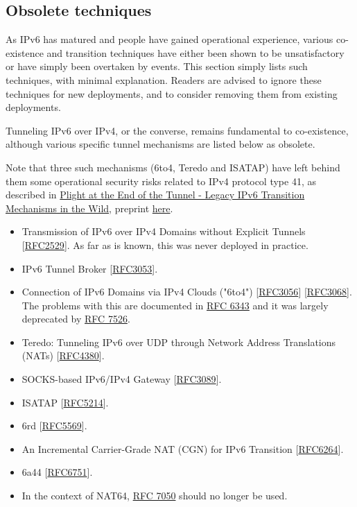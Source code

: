 \documentclass[
]{article}
\begin{document}
\pagebreak

\subsection{Obsolete techniques}\label{obsolete-techniques}

As IPv6 has matured and people have gained operational experience,
various co-existence and transition techniques have either been shown to
be unsatisfactory or have simply been overtaken by events. This section
simply lists such techniques, with minimal explanation. Readers are
advised to ignore these techniques for new deployments, and to consider
removing them from existing deployments.

Tunneling IPv6 over IPv4, or the converse, remains fundamental to
co-existence, although various specific tunnel mechanisms are listed
below as obsolete.

Note that three such mechanisms (6to4, Teredo and ISATAP) have left
behind them some operational security risks related to IPv4 protocol
type 41, as described in
\href{https://doi.org/10.1007/978-3-030-72582-2_23}{Plight at the End of
the Tunnel - Legacy IPv6 Transition Mechanisms in the Wild}, preprint
\href{https://dataplane.org/jtk/publications/kgkp-pam-21.pdf}{here}.

\begin{itemize}
\item
  Transmission of IPv6 over IPv4 Domains without Explicit Tunnels
  {[}\href{https://www.rfc-editor.org/info/rfc2529}{RFC2529}{]}. As far
  as is known, this was never deployed in practice.
\item
  IPv6 Tunnel Broker
  {[}\href{https://www.rfc-editor.org/info/rfc3053}{RFC3053}{]}.
\item
  Connection of IPv6 Domains via IPv4 Clouds ("6to4")
  {[}\href{https://www.rfc-editor.org/info/rfc3056}{RFC3056}{]}
  {[}\href{https://www.rfc-editor.org/info/rfc3068}{RFC3068}{]}. The
  problems with this are documented in
  \href{https://www.rfc-editor.org/info/rfc6343}{RFC 6343} and it was
  largely deprecated by
  \href{https://www.rfc-editor.org/info/rfc7526}{RFC 7526}.
\item
  Teredo: Tunneling IPv6 over UDP through Network Address Translations
  (NATs) {[}\href{https://www.rfc-editor.org/info/rfc4380}{RFC4380}{]}.
\item
  SOCKS-based IPv6/IPv4 Gateway
  {[}\href{https://www.rfc-editor.org/info/rfc3089}{RFC3089}{]}.
\item
  ISATAP {[}\href{https://www.rfc-editor.org/info/rfc5214}{RFC5214}{]}.
\item
  6rd {[}\href{https://www.rfc-editor.org/info/rfc5569}{RFC5569}{]}.
\item
  An Incremental Carrier-Grade NAT (CGN) for IPv6 Transition
  {[}\href{https://www.rfc-editor.org/info/rfc6264}{RFC6264}{]}.
\item
  6a44 {[}\href{https://www.rfc-editor.org/info/rfc6751}{RFC6751}{]}.
\item
  In the context of NAT64,
  \href{https://www.rfc-editor.org/info/rfc7050}{RFC 7050} should no
  longer be used.
\end{itemize}
\end{document}
